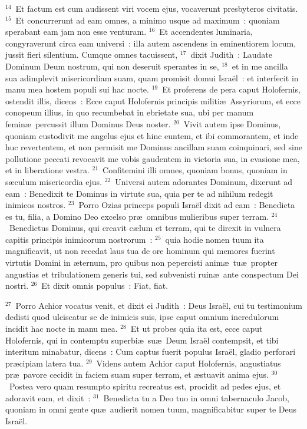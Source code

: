 ${}^{14}$~Et factum est cum audissent viri vocem ejus, vocaverunt presbyteros civitatis.
${}^{15}$~Et concurrerunt ad eam omnes, a minimo usque ad maximum~: quoniam sperabant eam jam non esse venturam.
${}^{16}$~Et accendentes luminaria, congyraverunt circa eam universi~: illa autem ascendens in eminentiorem locum, jussit fieri silentium. Cumque omnes tacuissent,
${}^{17}$~dixit Judith~: Laudate Dominum Deum nostrum, qui non deseruit sperantes in se,
${}^{18}$~et in me ancilla sua adimplevit misericordiam suam, quam promisit domui Isra\"el~: et interfecit in manu mea hostem populi sui hac nocte.
${}^{19}$~Et proferens de pera caput Holofernis, ostendit illis, dicens~: Ecce caput Holofernis principis militi\ae\ Assyriorum, et ecce conopeum illius, in quo recumbebat in ebrietate sua, ubi per manum femin\ae\ percussit illum Dominus Deus noster.
${}^{20}$~Vivit autem ipse Dominus, quoniam custodivit me angelus ejus et hinc euntem, et ibi commorantem, et inde huc revertentem, et non permisit me Dominus ancillam suam coinquinari, sed sine pollutione peccati revocavit me vobis gaudentem in victoria sua, in evasione mea, et in liberatione vestra.
${}^{21}$~Confitemini illi omnes, quoniam bonus, quoniam in s\ae culum misericordia ejus.
${}^{22}$~Universi autem adorantes Dominum, dixerunt ad eam~: Benedixit te Dominus in virtute sua, quia per te ad nihilum redegit inimicos nostros.
${}^{23}$~Porro Ozias princeps populi Isra\"el dixit ad eam~: Benedicta es tu, filia, a Domino Deo excelso pr\ae\ omnibus mulieribus super terram.
${}^{24}$~Benedictus Dominus, qui creavit c\ae lum et terram, qui te direxit in vulnera capitis principis inimicorum nostrorum~:
${}^{25}$~quia hodie nomen tuum ita magnificavit, ut non recedat laus tua de ore hominum qui memores fuerint virtutis Domini in \ae ternum, pro quibus non pepercisti anim\ae\ tu\ae\ propter angustias et tribulationem generis tui, sed subvenisti ruin\ae\ ante conspectum Dei nostri.
${}^{26}$~Et dixit omnis populus~: Fiat, fiat.


${}^{27}$~Porro Achior vocatus venit, et dixit ei Judith~: Deus Isra\"el, cui tu testimonium dedisti quod ulciscatur se de inimicis suis, ipse caput omnium incredulorum incidit hac nocte in manu mea.
${}^{28}$~Et ut probes quia ita est, ecce caput Holofernis, qui in contemptu superbi\ae\ su\ae\ Deum Isra\"el contempsit, et tibi interitum minabatur, dicens~: Cum captus fuerit populus Isra\"el, gladio perforari pr\ae cipiam latera tua.
${}^{29}$~Videns autem Achior caput Holofernis, angustiatus pr\ae\ pavore cecidit in faciem suam super terram, et \ae stuavit anima ejus.
${}^{30}$~Postea vero quam resumpto spiritu recreatus est, procidit ad pedes ejus, et adoravit eam, et dixit~:
${}^{31}$~Benedicta tu a Deo tuo in omni tabernaculo Jacob, quoniam in omni gente qu\ae\ audierit nomen tuum, magnificabitur super te Deus Isra\"el.

